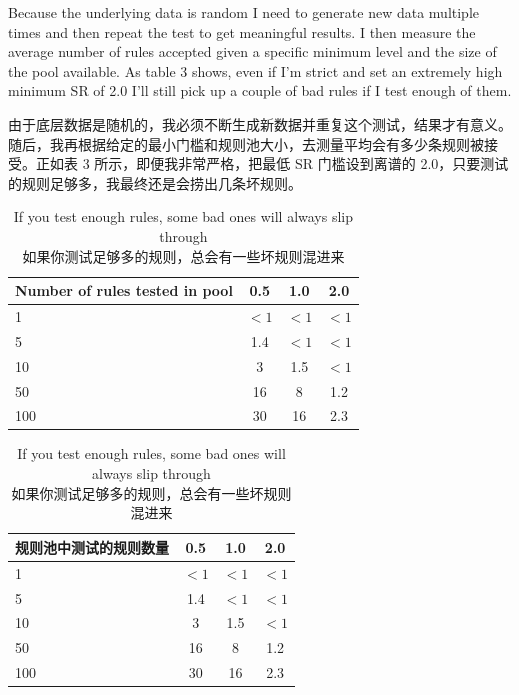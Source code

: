 \bipairgap

\begin{englishblock} Because the underlying data is random I need to generate new data multiple times and then repeat the test to get meaningful results. I then measure the average number of rules accepted given a specific minimum level and the size of the pool available. As table 3 shows, even if I'm strict and set an extremely high minimum SR of 2.0 I'll still pick up a couple of bad rules if I test enough of them. \end{englishblock}

\begin{chineseblock}由于底层数据是随机的，我必须不断生成新数据并重复这个测试，结果才有意义。随后，我再根据给定的最小门槛和规则池大小，去测量平均会有多少条规则被接受。正如表 3 所示，即便我非常严格，把最低 SR 门槛设到离谱的 2.0，只要测试的规则足够多，我最终还是会捞出几条坏规则。\end{chineseblock}

\begin{table}[htbp] \centering \small \caption{If you test enough rules, some bad ones will always slip through\\
如果你测试足够多的规则，总会有一些坏规则混进来}\begin{englishtableblock} \begin{tabular}{@{} lccc@{}}
\toprule
Number of rules tested in pool & 0.5 & 1.0 & 2.0 \\
\midrule
1 & $<1$ & $<1$ & $<1$ \\
5 & 1.4 & $<1$ & $<1$ \\
10 & 3 & 1.5 & $<1$ \\
50 & 16 & 8 & 1.2 \\
100 & 30 & 16 & 2.3 \\
\bottomrule
\end{tabular}
\end{englishtableblock}

  \medskip

\begin{chinesetableblock} \begin{tabular}{@{} lccc@{}}
\toprule
规则池中测试的规则数量 & 0.5 & 1.0 & 2.0 \\
\midrule
1 & $<1$ & $<1$ & $<1$ \\
5 & 1.4 & $<1$ & $<1$ \\
10 & 3 & 1.5 & $<1$ \\
50 & 16 & 8 & 1.2 \\
100 & 30 & 16 & 2.3 \\
\bottomrule
\end{tabular}
\end{chinesetableblock}
\end{table}

